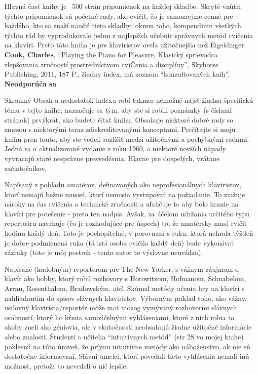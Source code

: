 \documentclass[11pt,a4paper%
]{article}
\begin{document}
Hlavná časť knihy je ~500 strán pripomienok na každej skladbe. Skryté vnútri týchto pripomienok sú početné rady, ako cvičiť, čo je samozrejme cenné pre každého, kto sa snaží naučiť tieto skladby; okrem toho, kompendium všetkých týchto rád by vyprodukovalo jednu z najlepších učebníc správnych metód cvičenia na klavíri. Preto táto kniha je pre klaviristov oveľa užitočnejšia než Eigeldinger.
\medskip\\
\textbf{Cook, Charles}, “Playing the Piano for Pleasure, Klasický sprievodca zlepšovania zručností prostredníctvom cviČenia a disciplíny”, Skyhorse Publishing, 2011, 187 P., žiadny index, má zoznam “konzultovaných kníh”. \textbf{Neodporúča sa}

Skromný Obsah a nedostatok indexu robí takmer nemožné nájsť žiadnu špecifickú tému v tejto knihe; naznačuje sa tým, aby ste si robili poznámky (s číslami stránok) prvýkrát, ako budete čítať knihu. Obsahuje niektoré dobré rady so zmesou s niektorými teraz zdiskreditovanými konceptami. Prečítajte si moju knihu pren touto, aby ste vedeli rozlíšiť medzi užitočnými a pochybnými radami. Jedná sa o aktualizované vydanie z roku 1960, a niektoré novších nápady vyvracajú staré nesprávne presvedčenia. Hlavne pre dospelých, vrátane začiatočníkov.

Napísaný z pohľadu amatérov, definovaných ako neprofesionálnych klaviristov, ktorí nemajú bežne musieť, ktorí nemusia vystupovať na požiadanie. To znižuje nároky na čas cvičenia a technické zručnosti a uľahčuje to aby bolo hranie na klavíri pre potešenie - preto ten nadpis. Avšak, za účelom udržania určitého typu repertoáru navrhuje (čo je rozhodujúce pre úspech) to, že amatérsky musí cvičiť hodinu každý deň. Toto je pochopiteľné; v porovnaní s ruku, ktorá nehrala týždeň je dobre podmienená ruka (tá istá osoba cvičila každý deň) bude vykonávať zázraky (toto je môj postreh - tento autor to výslovne neuvádza).

Napísané (hudobným) reportérom pre The New Yorker, s vážnym záujmom o klavír ako hobby, ktorý robil rozhovory s Horowitzom, Hofmanom, Schnabelom, Arrau, Rosenthalom, Brailowským, atď. Skúmal metódy učenia hry na klavíri s nahliadnutím do spisov slávnych klaviristov. Výborným príklad toho, ako vážny, usilovný klavirista/reportér môže mať mozog vymývaný rozhovormi slávnych osobností, ktorý ho kŕmia samoúčelnými vyhláseniami, ktoré z nich robia to akoby zneli ako géniovia, ale v skutočnosti neobsahujú žiadne užitočné informácie alebo znalosti. Študenti a učitelia “intuitívnych metód” (str 28 vo mojej knihe) poklesnú na túto úroveň, že príjmu intuitívne metódy ako náboženstvo, ak nie sú dostatočne informovaní. Slávni umelci, ktorí povedali tieto vyhlásenia nemali inú možnosť, pretože to nevedeli o nič lepšie.
\end{document}
